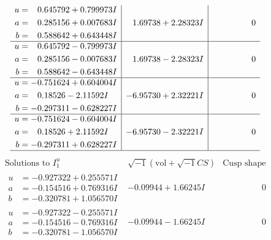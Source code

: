 \documentclass[1p]{elsarticle_modified}
\theoremstyle{definition}
\newcommand{\I}{\sqrt{-1}}
\begin{document}
$$\begin{array}{c|c|c}
\begin{aligned}
u &= \phantom{-}0.645792 + 0.799973 I \\
a &= \phantom{-}0.285156 + 0.007683 I \\
b &= \phantom{-}0.588642 + 0.643448 I\end{aligned}
 & \phantom{-}1.69738 + 2.28323 I & \phantom{-0.000000 } 0 \\ \hline\begin{aligned}
u &= \phantom{-}0.645792 - 0.799973 I \\
a &= \phantom{-}0.285156 - 0.007683 I \\
b &= \phantom{-}0.588642 - 0.643448 I\end{aligned}
 & \phantom{-}1.69738 - 2.28323 I & \phantom{-0.000000 } 0 \\ \hline\begin{aligned}
u &= -0.751624 + 0.604004 I \\
a &= \phantom{-}0.18526 - 2.11592 I \\
b &= -0.297311 - 0.628227 I\end{aligned}
 & -6.95730 + 2.32221 I & \phantom{-0.000000 } 0 \\ \hline\begin{aligned}
u &= -0.751624 - 0.604004 I \\
a &= \phantom{-}0.18526 + 2.11592 I \\
b &= -0.297311 + 0.628227 I\end{aligned}
 & -6.95730 - 2.32221 I & \phantom{-0.000000 } 0\\
 \hline 
 \end{array}$$\newpage$$\begin{array}{c|c|c}  
\text{Solutions to }I^u_{1}& \I (\text{vol} + \sqrt{-1}CS) & \text{Cusp shape}\\
 \hline 
\begin{aligned}
u &= -0.927322 + 0.255571 I \\
a &= -0.154516 + 0.769316 I \\
b &= -0.320781 + 1.056570 I\end{aligned}
 & -0.09944 + 1.66245 I & \phantom{-0.000000 } 0 \\ \hline\begin{aligned}
u &= -0.927322 - 0.255571 I \\
a &= -0.154516 - 0.769316 I \\
b &= -0.320781 - 1.056570 I\end{aligned}
 & -0.09944 - 1.66245 I & \phantom{-0.000000 } 0 \\ \hline\begin{aligned}

\end{aligned}
\end{array}$$
\end{document}
